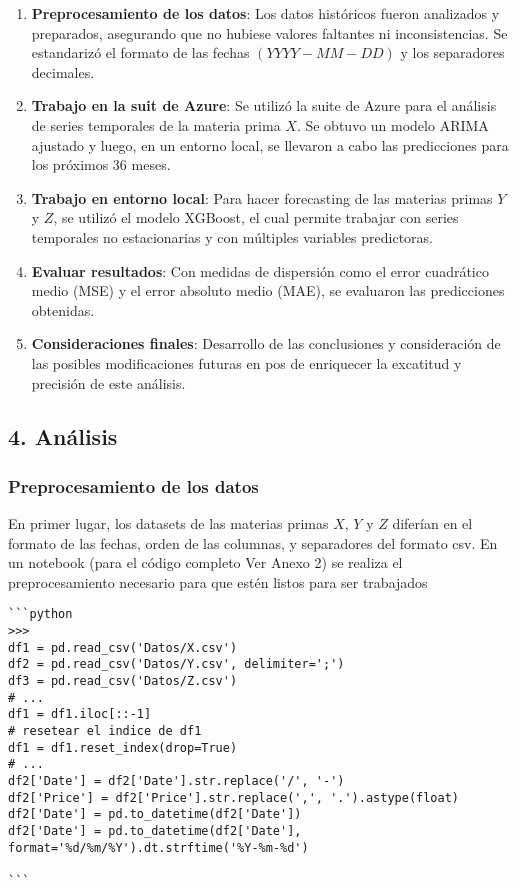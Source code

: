 \begin{enumerate}
\def\labelenumi{\arabic{enumi}.}
\tightlist
\item
  \textbf{Preprocesamiento de los datos}: Los datos históricos fueron
  analizados y preparados, asegurando que no hubiese valores faltantes
  ni inconsistencias. Se estandarizó el formato de las fechas
  \((YYYY-MM-DD)\) y los separadores decimales.
\item
  \textbf{Trabajo en la suit de Azure}: Se utilizó la suite de Azure
  para el análisis de series temporales de la materia prima \(X\). Se
  obtuvo un modelo ARIMA ajustado y luego, en un entorno local, se
  llevaron a cabo las predicciones para los próximos 36 meses.
\item
  \textbf{Trabajo en entorno local}: Para hacer forecasting de las
  materias primas \(Y\) y \(Z\), se utilizó el modelo XGBoost, el cual
  permite trabajar con series temporales no estacionarias y con
  múltiples variables predictoras.
\item
  \textbf{Evaluar resultados}: Con medidas de dispersión como el error
  cuadrático medio (MSE) y el error absoluto medio (MAE), se evaluaron
  las predicciones obtenidas.
\item
  \textbf{Consideraciones finales}: Desarrollo de las conclusiones y
  consideración de las posibles modificaciones futuras en pos de
  enriquecer la excatitud y precisión de este análisis.
\end{enumerate}

\subsection{4. Análisis}\label{anuxe1lisis}

\subsubsection{Preprocesamiento de los
datos}\label{preprocesamiento-de-los-datos}

En primer lugar, los datasets de las materias primas \(X\), \(Y\) y
\(Z\) diferían en el formato de las fechas, orden de las columnas, y
separadores del formato csv. En un notebook (para el código completo Ver
Anexo 2) se realiza el preprocesamiento necesario para que estén listos
para ser trabajados

\begin{verbatim}
```python
>>>
df1 = pd.read_csv('Datos/X.csv')
df2 = pd.read_csv('Datos/Y.csv', delimiter=';')
df3 = pd.read_csv('Datos/Z.csv')
# ...
df1 = df1.iloc[::-1]
# resetear el indice de df1
df1 = df1.reset_index(drop=True)
# ...
df2['Date'] = df2['Date'].str.replace('/', '-')
df2['Price'] = df2['Price'].str.replace(',', '.').astype(float)
df2['Date'] = pd.to_datetime(df2['Date'])
df2['Date'] = pd.to_datetime(df2['Date'], format='%d/%m/%Y').dt.strftime('%Y-%m-%d')

```
\end{verbatim}

